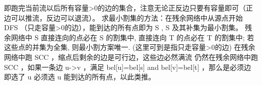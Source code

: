 {}\markdownRendererInterblockSeparator
{}
\markdownRendererSectionEnd \markdownRendererSectionBegin
{}\markdownRendererInterblockSeparator
{}\markdownRendererSectionBegin
\markdownRendererSectionBegin
{}\markdownRendererInterblockSeparator
{}即跑完当前流以后所有容量>0的边的集合，注意无论正反边只要有容量即可（正边可以推流，反边可以退流）。\markdownRendererInterblockSeparator
{}
\markdownRendererSectionEnd \markdownRendererSectionBegin
{}\markdownRendererInterblockSeparator
{}求最小割集的方法：在残余网络中从源点开始\markdownRendererDollarSign{} DFS \markdownRendererDollarSign{}（只走容量>0的边），能到达的所有点即为\markdownRendererDollarSign{} S \markdownRendererDollarSign{},\markdownRendererDollarSign{} S \markdownRendererDollarSign{}及其补集为最小割集。\markdownRendererInterblockSeparator
{}
\markdownRendererSectionEnd \markdownRendererSectionBegin
{}\markdownRendererInterblockSeparator
{}残余网络中\markdownRendererDollarSign{} S \markdownRendererDollarSign{}直接连向的点必在\markdownRendererDollarSign{} S \markdownRendererDollarSign{}的割集中, 直接连向\markdownRendererDollarSign{} T \markdownRendererDollarSign{}的点必在\markdownRendererDollarSign{} T \markdownRendererDollarSign{}的割集中; 若这些点的并集为全集, 则最小割方案唯一.\markdownRendererParagraphSeparator
{}(这里可到是指只走容量>0的边)\markdownRendererInterblockSeparator
{}
\markdownRendererSectionEnd \markdownRendererSectionBegin
{}\markdownRendererInterblockSeparator
{}在残余网络中跑\markdownRendererDollarSign{} SCC \markdownRendererDollarSign{}，缩点后剩余的边是可行边，这些边必然满流\markdownRendererInterblockSeparator
{}
\markdownRendererSectionEnd \markdownRendererSectionBegin
{}\markdownRendererInterblockSeparator
{}仍然在残余网络中跑\markdownRendererDollarSign{} SCC \markdownRendererDollarSign{}，如果一条边\markdownRendererDollarSign{} u->v \markdownRendererDollarSign{}，满足\markdownRendererDollarSign{} bel[u]=bel[s] \markdownRendererBackslash{} and\markdownRendererBackslash{}  bel[v]=bel[t] \markdownRendererDollarSign{}，那么是必须边\markdownRendererInterblockSeparator
{}
\markdownRendererSectionEnd \markdownRendererSectionBegin
{}\markdownRendererInterblockSeparator
{}即选了\markdownRendererDollarSign{} u \markdownRendererDollarSign{}必须选\markdownRendererDollarSign{} u \markdownRendererDollarSign{}能到达的所有点，以此类推。\markdownRendererParagraphSeparator
